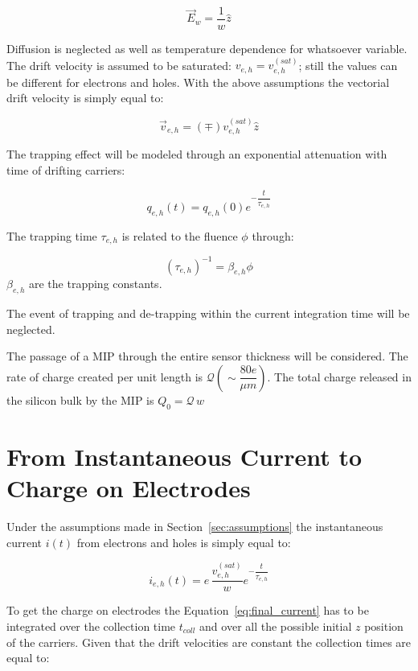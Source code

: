 \begin{equation}
\vec{E}_w=\dfrac{1}{w}\hat{z}
\end{equation}

Diffusion is neglected as well as temperature dependence for whatsoever variable. 
The drift velocity is assumed to be saturated: $v_{e,h}=v^{(sat)}_{e,h}$; still the values can be different for electrons and holes. 
With the above assumptions the vectorial drift velocity is simply equal to:

\begin{equation}
\vec{v}_{e,h}=(\mp)v^{(sat)}_{e,h}\hat{z}
\end{equation}

The trapping effect will be modeled through an exponential attenuation with time of drifting carriers:

\begin{equation}
q_{e,h}(t) = q_{e,h}(0)e^{-\dfrac{t}{\tau_{e,h}}}
\end{equation}

The trapping time $\tau_{e,h}$ is related to the fluence $\phi$ through:

\begin{equation}
(\tau_{e,h})^{-1}=\beta_{e,h}\phi
\end{equation}
$\beta_{e,h}$ are the trapping constants.

The event of trapping and de-trapping within the current integration time will be neglected.

The passage of a MIP through the entire sensor thickness will be considered. The 
rate of charge created per unit length is $\mathcal{Q} (\sim \dfrac{80e}{\mu m})$. The total charge 
released in the silicon bulk by the MIP is $Q_0=\mathcal{Q}\,w$

\section{From Instantaneous Current to Charge on Electrodes}
\label{sec:charge}
Under the assumptions made in Section~\ref{sec:assumptions} the instantaneous current $i(t)$ 
from electrons and holes is simply equal to:

\begin{equation}
i_{e,h}(t)=e\,\dfrac{v^{(sat)}_{e,h}}{w}e^{-\dfrac{t}{\tau_{e,h}}}
\label{eq:final_current}
\end{equation}

To get the charge on electrodes the Equation~\ref{eq:final_current} has to be integrated over the collection time $t_{coll}$ and over all the possible initial $z$ position of the carriers.
Given that the drift velocities are constant the collection times are equal to:

